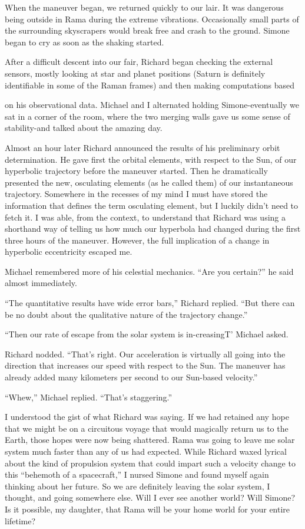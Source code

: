 \documentclass[]{article}
\begin{document}
When the maneuver began, we returned quickly to our lair.  It was dangerous being outside in Rama during the extreme vibrations.  Occasionally small parts of the surrounding skyscrapers would break free and crash to the ground.  Simone began to cry as soon as the shaking started.

After a difficult descent into our fair, Richard began checking the external sensors, mostly looking at star and planet positions (Saturn is definitely identifiable in some of the Raman frames) and then making computations based

on his observational data.  Michael and I alternated holding Simone-eventually we sat in a corner of the room, where the two merging walls gave us some sense of stability-and talked about the amazing day.

Almost an hour later Richard announced the results of his preliminary orbit determination.  He gave first the orbital elements, with respect to the Sun, of our hyperbolic trajectory before the maneuver started.  Then he dramatically presented the new, osculating elements (as he called them) of our instantaneous trajectory.  Somewhere in the recesses of my mind I must have stored the information that defines the term osculating element, but I luckily didn’t need to fetch it.  I was able, from the context, to understand that Richard was using a shorthand way of telling us how much our hyperbola had changed during the first three hours of the maneuver.  However, the full implication of a change in hyperbolic eccentricity escaped me.

Michael remembered more of his celestial mechanics.  “Are you certain?” he said almost immediately.

“The quantitative results have wide error bars,” Richard replied.  “But there can be no doubt about the qualitative nature of the trajectory change.”

“Then our rate of escape from the solar system is in-creasingT’ Michael asked.

Richard nodded.  “That’s right.  Our acceleration is virtually all going into the direction that increases our speed with respect to the Sun.  The maneuver has already added many kilometers per second to our Sun-based velocity.”

“Whew,” Michael replied.  “That’s staggering.”

I understood the gist of what Richard was saying.  If we had retained any hope that we might be on a circuitous voyage that would magically return us to the Earth, those hopes were now being shattered.  Rama was going to leave me solar system much faster than any of us had expected.  While Richard waxed lyrical about the kind of propulsion system that could impart such a velocity change to this “behemoth of a spacecraft,” I nursed Simone and found myself again thinking about her future.  So we are definitely leaving the solar system, I thought, and going somewhere else.  Will I ever see another world? Will Simone? Is it possible, my daughter, that Rama will be your home world for your entire lifetime?
\end{document}
